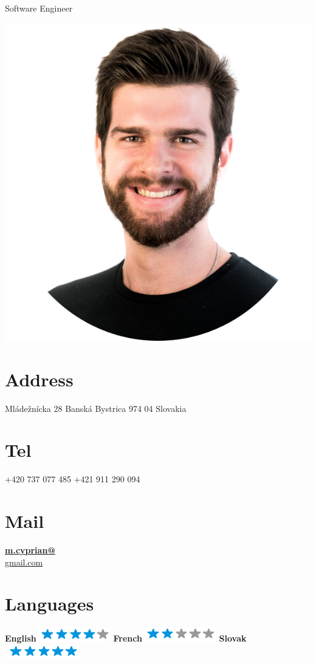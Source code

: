\documentclass[]{friggeri-cv}
\begin{document}
      {Software Engineer}
      

\begin{aside}
  \includegraphics[scale=0.18]{img/mcyprian.png}
  \section{Address}
    Mládežnícka 28
    Banská Bystrica
    974 04
    Slovakia
    ~
  \section{Tel}
    +420 737 077 485
    +421 911 290 094
    ~
  \section{Mail}
    \href{mailto:m.cyprian@gmail.com}{\textbf{m.cyprian@}\\gmail.com}
    ~
  \section{Languages}
    \textbf{English}\includegraphics[scale=0.40]{img/4stars.png}
    \textbf{French}\includegraphics[scale=0.40]{img/2stars.png}
    \textbf{Slovak}\includegraphics[scale=0.40]{img/5stars.png}
    ~

\end{aside}
\end{document}
